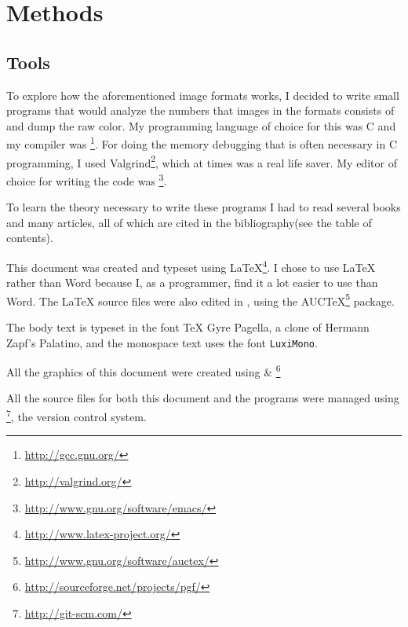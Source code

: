 \begin{comment}
  
\end{comment}

\chapter{Methods}
\label{cha:method}

\newcommand{\CC}{C\nolinebreak\hspace{-.05em}\raisebox{.4ex}{\tiny\bfseries +}\nolinebreak\hspace{-.10em}\raisebox{.4ex}{\tiny\bfseries +}}

\section{Tools}

\newcommand{\credits}[1]{\footnote{\url{#1}}}

To explore how the aforementioned image formats works, I decided to
write small programs that would analyze the numbers that images in the
formats consists of and dump the raw color. My programming language of
choice for this was \CC{} and my compiler was
\gcc\credits{http://gcc.gnu.org/}. For doing the memory debugging that
is often necessary in \CC{} programming, I used
Valgrind\credits{http://valgrind.org/}, which at times was a real life
saver. My editor of choice for writing the code was
\emacs\credits{http://www.gnu.org/software/emacs/}.

To learn the theory necessary to write these programs I had to read
several books and many articles, all of which are cited in the
bibliography(see the table of contents).

This document was created and typeset using
\LaTeX{}\credits{http://www.latex-project.org/}. I chose to use
\LaTeX{} rather than Word because I, as a programmer, find it a lot
easier to use than Word. The \LaTeX{} source files were also edited in
\emacs, using the
AUC\TeX{}\credits{http://www.gnu.org/software/auctex/} package.

The body text is typeset in the font \TeX{} Gyre Pagella, a clone of
Hermann Zapf's Palatino, and the monospace text uses the font
\texttt{LuxiMono}.

All the graphics of this document were created using
\tikzname \& \pgf\credits{http://sourceforge.net/projects/pgf/}

All the source files for both this document and the programs were
managed using \git\credits{http://git-scm.com/}, the version control system.

